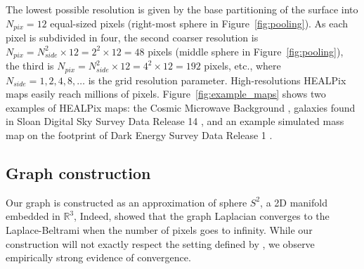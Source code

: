 \documentclass[final,twocolumn,3p,times,sort&compress]{elsarticle}
\newcommand{\figref}[1]{Figure~\ref{fig:#1}}
\newcommand{\1}{\b{1}}              %
\newcommand{\0}{\b{0}}              %
\begin{document}
The lowest possible resolution is given by the base partitioning of the surface into $N_{pix} = 12$ equal-sized pixels (right-most sphere in \figref{pooling}).
As each pixel is subdivided in four, the second coarser resolution is $N_{pix} = N_{side}^2 \times 12 = 2^2 \times 12 = 48$ pixels (middle sphere in \figref{pooling}), the third is $N_{pix} = N_{side}^2 \times 12 = 4^2 \times 12 = 192$ pixels, etc., where $N_{side} = 1, 2, 4, 8, \ldots$ is the grid resolution parameter.
High-resolutions HEALPix maps easily reach millions of pixels.
\figref{example_maps} shows two examples of HEALPix maps: the Cosmic Microwave Background \citep{planck2015overview}, galaxies found in Sloan Digital Sky Survey Data Release 14 \citep{abolfathi2017sdssDR14}, and an example simulated mass map on the footprint of Dark Energy Survey Data Release 1 \citep{des2018dr1}.

\subsection{Graph construction}

Our graph is constructed as an approximation of sphere $S^2$, a 2D manifold embedded in $\mathbb{R}^3$,
Indeed, \citep{belkin2007convergence} showed that the graph Laplacian converges to the Laplace-Beltrami when the number of pixels goes to infinity.
While our construction will not exactly respect the setting defined by \citep{belkin2007convergence}, we observe empirically strong evidence of convergence.
\end{document}
